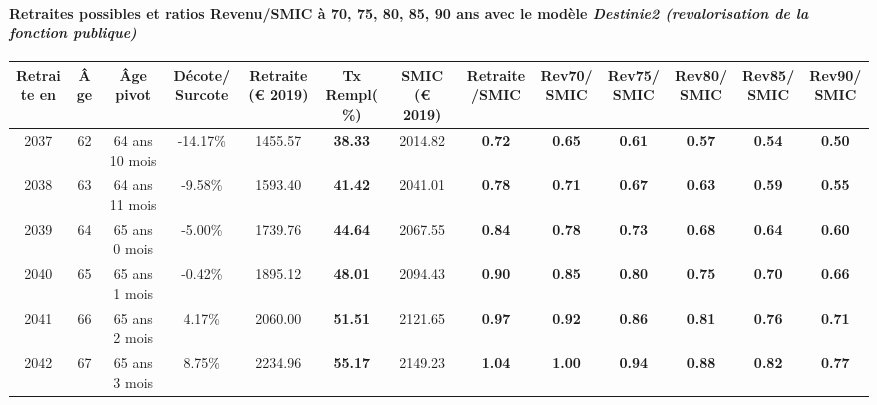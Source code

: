 \paragraph{Retraites possibles et ratios Revenu/SMIC à 70, 75, 80, 85, 90 ans avec le modèle \emph{Destinie2 (revalorisation de la fonction publique)}}  
 
{ \scriptsize \begin{center} 
\begin{tabular}[htb]{|c|c||c|c||c|c||c||c|c|c|c|c|c|} 
\hline 
 Retraite en &  Âge &  Âge pivot &  Décote/Surcote &  Retraite (\euro{} 2019) &  Tx Rempl(\%) &  SMIC (\euro{} 2019) &  Retraite/SMIC &  Rev70/SMIC &  Rev75/SMIC &  Rev80/SMIC &  Rev85/SMIC &  Rev90/SMIC \\ 
\hline \hline 
 2037 &  62 &  64 ans 10 mois &  -14.17\% &  1455.57 &  {\bf 38.33} &  2014.82 &  {\bf {\color{red} 0.72}} &  {\bf {\color{red} 0.65}} &  {\bf {\color{red} 0.61}} &  {\bf {\color{red} 0.57}} &  {\bf {\color{red} 0.54}} &  {\bf {\color{red} 0.50}} \\ 
\hline 
 2038 &  63 &  64 ans 11 mois &  -9.58\% &  1593.40 &  {\bf 41.42} &  2041.01 &  {\bf {\color{red} 0.78}} &  {\bf {\color{red} 0.71}} &  {\bf {\color{red} 0.67}} &  {\bf {\color{red} 0.63}} &  {\bf {\color{red} 0.59}} &  {\bf {\color{red} 0.55}} \\ 
\hline 
 2039 &  64 &  65 ans 0 mois &  -5.00\% &  1739.76 &  {\bf 44.64} &  2067.55 &  {\bf {\color{red} 0.84}} &  {\bf {\color{red} 0.78}} &  {\bf {\color{red} 0.73}} &  {\bf {\color{red} 0.68}} &  {\bf {\color{red} 0.64}} &  {\bf {\color{red} 0.60}} \\ 
\hline 
 2040 &  65 &  65 ans 1 mois &  -0.42\% &  1895.12 &  {\bf 48.01} &  2094.43 &  {\bf {\color{red} 0.90}} &  {\bf {\color{red} 0.85}} &  {\bf {\color{red} 0.80}} &  {\bf {\color{red} 0.75}} &  {\bf {\color{red} 0.70}} &  {\bf {\color{red} 0.66}} \\ 
\hline 
 2041 &  66 &  65 ans 2 mois &  4.17\% &  2060.00 &  {\bf 51.51} &  2121.65 &  {\bf {\color{red} 0.97}} &  {\bf {\color{red} 0.92}} &  {\bf {\color{red} 0.86}} &  {\bf {\color{red} 0.81}} &  {\bf {\color{red} 0.76}} &  {\bf {\color{red} 0.71}} \\ 
\hline 
 2042 &  67 &  65 ans 3 mois &  8.75\% &  2234.96 &  {\bf 55.17} &  2149.23 &  {\bf 1.04} &  {\bf 1.00} &  {\bf {\color{red} 0.94}} &  {\bf {\color{red} 0.88}} &  {\bf {\color{red} 0.82}} &  {\bf {\color{red} 0.77}} \\ 
\hline 
\hline 
\end{tabular} 
\end{center} } 

